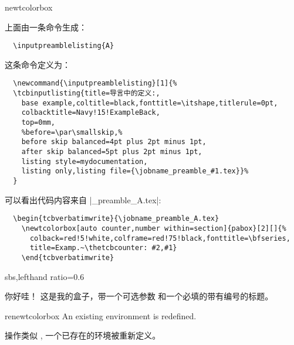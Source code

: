 \begin{docCommand}{newtcolorbox}{}
\begin{tcolorbox}[breakable, title=译者对上面这个盒子的分析]
  上面由一条命令生成：

  \begin{verbatim}
  \inputpreamblelisting{A}
  \end{verbatim}

  \tcbline  

  这条命令定义为：
  \begin{verbatim}
  \newcommand{\inputpreamblelisting}[1]{%
  \tcbinputlisting{title=导言中的定义:,
    base example,coltitle=black,fonttitle=\itshape,titlerule=0pt,
    colbacktitle=Navy!15!ExampleBack,
    top=0mm,
    %before=\par\smallskip,%
    before skip balanced=4pt plus 2pt minus 1pt,
    after skip balanced=5pt plus 2pt minus 1pt,
    listing style=mydocumentation,
    listing only,listing file={\jobname_preamble_#1.tex}}%
  }
  \end{verbatim}

  \tcbline  

  可以看出代码内容来自 |\jobname_preamble_A.tex|\footnotemark:
  \begin{verbatim}
  \begin{tcbverbatimwrite}{\jobname_preamble_A.tex}
    \newtcolorbox[auto counter,number within=section]{pabox}[2][]{%
      colback=red!5!white,colframe=red!75!black,fonttitle=\bfseries,
      title=Examp.~\thetcbcounter: #2,#1}
    \end{tcbverbatimwrite}
  \end{verbatim}
\end{tcolorbox}

\begin{dispExample*}{sbs,lefthand ratio=0.6}
\begin{pabox}[colback=yellow]{你好哇！}
这是我的盒子，带一个可选参数%
和一个必填的带有编号的标题。
\end{pabox}
\end{dispExample*}
\end{docCommand}


\begin{docCommand}{renewtcolorbox}{}
An existing environment is redefined.%


操作类似 , 一个已存在的环境被重新定义。%
\end{docCommand}